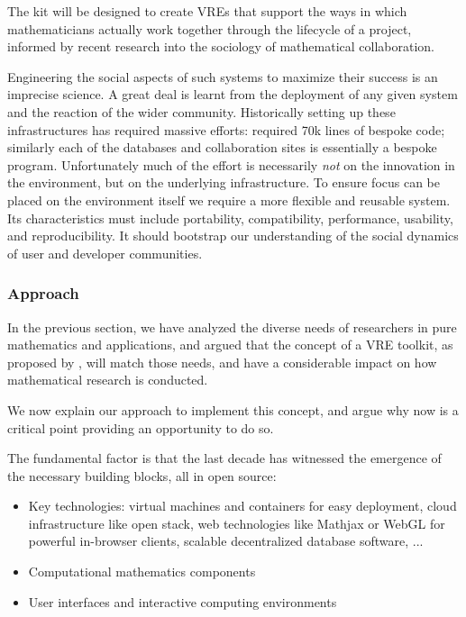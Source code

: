 The kit will be designed to create VREs that support the ways in which
mathematicians actually work together through the lifecycle of a
project, informed by recent research into the sociology of
mathematical collaboration.

Engineering the social aspects of such systems to maximize their
success is an imprecise science. A great deal is learnt from the
deployment of any given system and the reaction of the wider
community. Historically setting up these infrastructures has required
massive efforts: \SMC required 70k lines of
bespoke code; similarly each of
the databases and collaboration sites is essentially a bespoke
program. Unfortunately much of the effort is necessarily \emph{not} on
the innovation in the environment, but on the underlying
infrastructure. To ensure focus can be placed on the environment
itself we require a more flexible and reusable system. Its
characteristics must include portability, compatibility, performance,
usability, and reproducibility. It should bootstrap our understanding
of the social dynamics of user and developer communities.

\subsubsection{Approach}

In the previous section, we have analyzed the diverse needs of
researchers in pure mathematics and applications, and argued that the
concept of a VRE toolkit, as proposed by \TheProject, will match those
needs, and have a considerable impact on how mathematical research is
conducted.

We now explain our approach to implement this concept, and argue why
now is a critical point providing an opportunity to do so.
\begin{framed}
  The fundamental factor is that the last decade has witnessed the
  emergence of the necessary building blocks, all in open source:
  \begin{itemize}
  \item Key technologies: virtual machines and containers for easy
    deployment, cloud infrastructure like open stack, web technologies
    like Mathjax or WebGL for powerful in-browser clients, scalable
    decentralized database software, ...
  \item Computational mathematics components
  \item User interfaces and interactive computing environments
  \end{itemize}
\end{framed}

